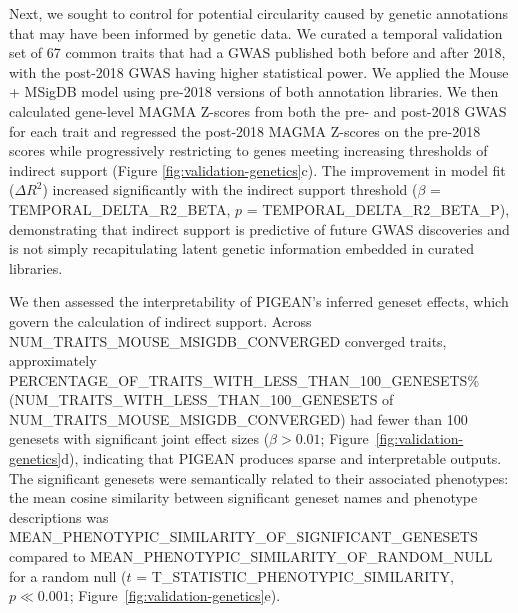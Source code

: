 Next, we sought to control for potential circularity caused by genetic annotations that may have been informed by genetic data. We curated a temporal validation set of 67 common traits that had a GWAS published both before and after 2018, with the post-2018 GWAS having higher statistical power. We applied the Mouse + MSigDB model using pre-2018 versions of both annotation libraries. We then calculated gene-level MAGMA Z-scores from both the pre- and post-2018 GWAS for each trait and regressed the post-2018 MAGMA Z-scores on the pre-2018 scores while progressively restricting to genes meeting increasing thresholds of indirect support (Figure \ref{fig:validation-genetics}c). The improvement in model fit ($\Delta R^2$) increased significantly with the indirect support threshold ($\beta$ = {{TEMPORAL_DELTA_R2_BETA}}, $p$ = {{TEMPORAL_DELTA_R2_BETA_P}}), demonstrating that indirect support is predictive of future GWAS discoveries and is not simply recapitulating latent genetic information embedded in curated libraries.

We then assessed the interpretability of PIGEAN's inferred geneset effects, which govern the calculation of indirect support. Across {{NUM_TRAITS_MOUSE_MSIGDB_CONVERGED}} converged traits, approximately {{PERCENTAGE_OF_TRAITS_WITH_LESS_THAN_100_GENESETS}}\% ({{NUM_TRAITS_WITH_LESS_THAN_100_GENESETS}} of {{NUM_TRAITS_MOUSE_MSIGDB_CONVERGED}}) had fewer than 100 genesets with significant joint effect sizes ($\beta > 0.01$; Figure~\ref{fig:validation-genetics}d), indicating that PIGEAN produces sparse and interpretable outputs. The significant genesets were semantically related to their associated phenotypes: the mean cosine similarity between significant geneset names and phenotype descriptions was {{MEAN_PHENOTYPIC_SIMILARITY_OF_SIGNIFICANT_GENESETS}} compared to {{MEAN_PHENOTYPIC_SIMILARITY_OF_RANDOM_NULL}} for a random null ($t$ = {{T_STATISTIC_PHENOTYPIC_SIMILARITY}}, $p \ll 0.001$; Figure~\ref{fig:validation-genetics}e).
